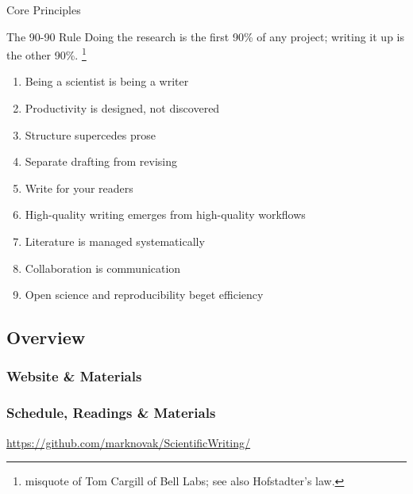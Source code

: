 \documentclass{beamer}
\begin{document}
\begin{frame}{Core Principles}

    \begin{block}{The 90-90 Rule}
    Doing the research is the first 90\% of any project; writing it up is the other 90\%.%
    \footnote{misquote of Tom Cargill of Bell Labs; see also Hofstadter's law.}
    \end{block}

    \footnotesize

    \begin{enumerate}
        \item Being a scientist is being a writer
        \item Productivity is designed, not discovered
        \item Structure supercedes prose
        \item Separate drafting from revising
        \item Write for your readers
        \item High-quality writing emerges from high-quality workflows
        \item Literature is managed systematically
        \item Collaboration is communication
        \item Open science and reproducibility beget efficiency
    \end{enumerate}

\end{frame}



\subsection{Overview}



\subsubsection{Website \& Materials}

\begin{frame}
    \frametitle{Schedule, Readings \& Materials}
    \small{    \url{https://github.com/marknovak/ScientificWriting/} }

\end{frame}

\end{document}
